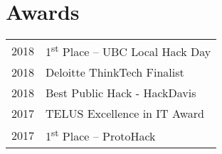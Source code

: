 \documentclass[]{deedy-resume-openfont}
\begin{document}
\begin{minipage}[t]{0.3\textwidth}

\section{Awards} 
\begin{tabular}{ll}
2018 & 1\textsuperscript{st} Place – UBC Local Hack Day\\
2018 & Deloitte ThinkTech Finalist\\
2018 & Best Public Hack - HackDavis \\
2017 & TELUS Excellence in IT Award \\
2017 & 1\textsuperscript{st} Place – ProtoHack \\
\end{tabular}
\sectionsep

%
%

\end{minipage} 
\hfill
\end{document}
